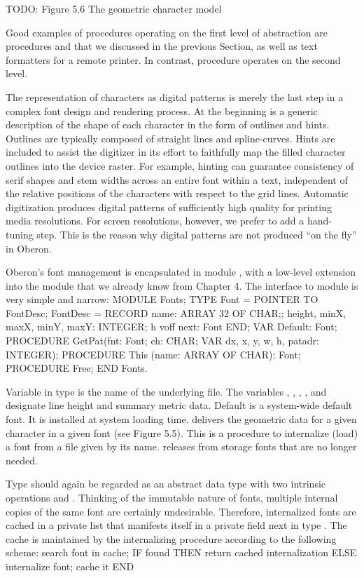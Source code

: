 TODO: Figure 5.6 The geometric character model

Good examples of procedures operating on the first level of abstraction are procedures  and  that we discussed in the previous Section, as well as text formatters for a remote printer. In contrast, procedure  operates on the second level.

The representation of characters as digital patterns is merely the last step in a complex font design and rendering process. At the beginning is a generic description of the shape of each character in the form of outlines and hints. Outlines are typically composed of straight lines and spline-curves. Hints are included to assist the digitizer in its effort to faithfully map the filled character outlines into the device raster. For example, hinting can guarantee consistency of serif shapes and stem widths across an entire font within a text, independent of the relative positions of the characters with respect to the grid lines. Automatic digitization produces digital patterns of sufficiently high quality for printing media resolutions. For screen resolutions, however, we prefer to add a hand-tuning step. This is the reason why digital patterns are not produced ``on the fly'' in Oberon.

Oberon's font management is encapsulated in module , with a low-level extension into the module  that we already know from Chapter 4. The interface to module  is very simple and narrow:
\begintt
MODULE Fonts;
TYPE Font = POINTER TO FontDesc; FontDesc = RECORD
name: ARRAY 32 OF CHAR;;
height, minX, maxX, minY, maxY: INTEGER;
h voff
next: Font END;
VAR Default: Font;
PROCEDURE GetPat(fnt: Font; ch: CHAR; VAR dx, x, y, w, h, patadr: INTEGER); PROCEDURE This (name: ARRAY OF CHAR): Font;
PROCEDURE Free;
END Fonts.
\endtt

\noindent Variable  in type  is the name of the underlying file. The variables , , , , and  designate line height and summary metric data. Default is a system-wide default font. It is installed at system loading time.  delivers the geometric data for a given character in a given font (see Figure 5.5). This is a procedure to internalize (load) a font from a file given by its name.  releases from storage fonts that are no longer needed.

Type  should again be regarded as an abstract data type with two intrinsic operations  and . Thinking of the immutable nature of fonts, multiple internal copies of the same font are certainly undesirable. Therefore, internalized fonts are cached in a private list that manifests itself in a private field next in type . The cache is maintained by the internalizing procedure  according to the following scheme:
\begintt
search font in cache;
IF found THEN return cached internalization
ELSE internalize font; cache it
END
\endtt

